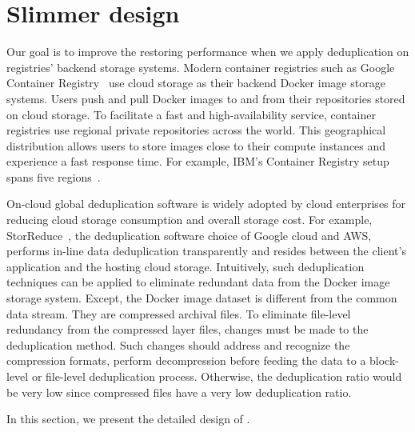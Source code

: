 \section{Slimmer design}
\label{sec:slimmer}

%



Our goal is to improve the restoring performance when we apply deduplication on registries' backend storage systems.
Modern container registries such as Google Container Registry~\cite{GoogleContainerRegistry} use cloud storage as their backend Docker image storage systems. Users push and pull Docker images to and from their repositories stored on cloud storage. To facilitate a fast and high-availability service, container registries use regional private repositories across the world.  This geographical distribution allows users to store images close to their compute instances and experience a fast response time. For example, IBM's Container Registry setup spans five regions~\cite{anwarfast}. 

On-cloud global deduplication software is widely adopted by cloud enterprises for reducing cloud storage consumption and overall storage cost. For example, StorReduce~\cite{storreduce_purestorage}, the deduplication software choice of Google cloud and AWS, performs in-line data deduplication transparently and resides between the client's application and the hosting cloud storage.
Intuitively, such deduplication techniques can be applied to eliminate redundant data from the Docker image storage system.  
Except, the Docker image dataset is different from the common data stream. They are compressed archival files.
To eliminate file-level redundancy from the compressed layer files, changes must be made to the deduplication method. Such changes should address and recognize the compression formats, perform decompression before feeding the data to a block-level or file-level deduplication process. Otherwise, the deduplication ratio would be very low since compressed files have a very low deduplication ratio. 

In this section, we present the detailed design of \sysname.










